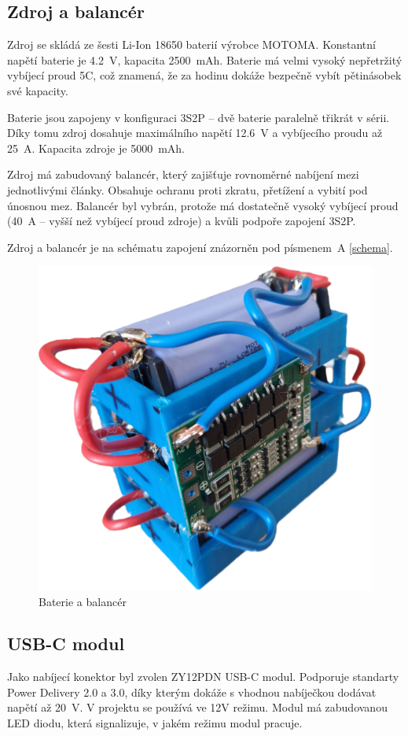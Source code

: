 \subsection*{Zdroj a balancér}
Zdroj se skládá ze šesti Li-Ion 18650 baterií výrobce MOTOMA.  Konstantní napětí baterie je 4.2~V, kapacita 2500~mAh. Baterie má velmi vysoký nepřetržitý vybíjecí proud 5C, což znamená, že za hodinu dokáže bezpečně vybít pětinásobek své kapacity.

Baterie jsou zapojeny v konfiguraci 3S2P -- dvě baterie paralelně třikrát v sérii. Díky tomu zdroj dosahuje maximálního napětí 12.6~V a vybíjecího proudu až 25~A. Kapacita zdroje je 5000~mAh.

Zdroj má zabudovaný balancér, který zajišťuje rovnoměrné nabíjení mezi jednotlivými články. Obsahuje ochranu proti zkratu, přetížení a vybití pod únosnou mez. Balancér byl vybrán, protože má dostatečně vysoký vybíjecí proud (40~A -- vyšší než vybíjecí proud zdroje) a kvůli podpoře zapojení 3S2P.

Zdroj a balancér je na schématu zapojení znázorněn pod písmenem~A \ref{schema}.

\begin{figure}[H]
    \centering
    \includegraphics[width=0.6\linewidth]{obrazky-figures/battery.png}
    \caption {Baterie a balancér}
    \label{baterie}
\end{figure}

\subsection*{USB-C modul}
Jako nabíjecí konektor byl zvolen ZY12PDN USB-C modul. Podporuje standarty Power Delivery 2.0 a 3.0, díky kterým dokáže s vhodnou nabíječkou dodávat napětí až 20~V. V projektu se používá ve 12V režimu. Modul má zabudovanou LED diodu, která signalizuje, v jakém režimu modul pracuje.

